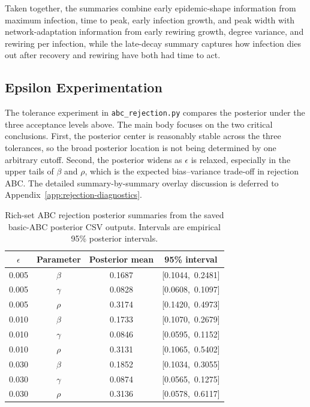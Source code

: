 \documentclass[11pt]{article}
\begin{document}
Taken together, the summaries combine early epidemic-shape information from maximum infection, time to peak, early infection growth, and peak width with network-adaptation information from early rewiring growth, degree variance, and rewiring per infection, while the late-decay summary captures how infection dies out after recovery and rewiring have both had time to act.

\subsection{Epsilon Experimentation}

The tolerance experiment in \texttt{abc\_rejection.py} compares the posterior under the three acceptance levels above. The main body focuses on the two critical conclusions. First, the posterior center is reasonably stable across the three tolerances, so the broad posterior location is not being determined by one arbitrary cutoff. Second, the posterior widens as $\epsilon$ is relaxed, especially in the upper tails of $\beta$ and $\rho$, which is the expected bias--variance trade-off in rejection ABC. The detailed summary-by-summary overlay discussion is deferred to Appendix~\ref{app:rejection-diagnostics}.

\begin{table}[H]
\centering
\caption{Rich-set ABC rejection posterior summaries from the saved basic-ABC posterior CSV outputs. Intervals are empirical 95\% posterior intervals.}
\label{tab:epsilon-results}
\begin{tabular}{cccc}
\toprule
$\epsilon$ & Parameter & Posterior mean & 95\% interval \\
\midrule
0.005 & $\beta$ & 0.1687 & [0.1044,\ 0.2481] \\
0.005 & $\gamma$ & 0.0828 & [0.0608,\ 0.1097] \\
0.005 & $\rho$ & 0.3174 & [0.1420,\ 0.4973] \\
\midrule
0.010 & $\beta$ & 0.1733 & [0.1070,\ 0.2679] \\
0.010 & $\gamma$ & 0.0846 & [0.0595,\ 0.1152] \\
0.010 & $\rho$ & 0.3131 & [0.1065,\ 0.5402] \\
\midrule
0.030 & $\beta$ & 0.1852 & [0.1034,\ 0.3055] \\
0.030 & $\gamma$ & 0.0874 & [0.0565,\ 0.1275] \\
0.030 & $\rho$ & 0.3136 & [0.0578,\ 0.6117] \\
\bottomrule
\end{tabular}
\end{table}
\end{document}
